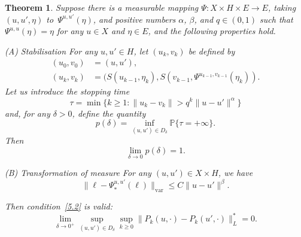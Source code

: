 \documentclass[11pt]{article}
\theoremstyle{plain}
\newtheorem{theorem}{Theorem}[section]
\theoremstyle{definition}
\newtheorem*{namedassumption}{\jepassumptionname}
\newenvironment{enonce*}[1]{\def\jepassumptionname{#1}\begin{namedassumption}}{\end{namedassumption}}
\theoremstyle{plain}
\numberwithin{equation}{section}
\newcommand{\IP}{{\mathbb P}}
\begin{document}
\begin{theorem} \label{T:1.2}
Suppose there is a measurable mapping $\varPsi:X\times H\times E\to E$, taking $(u,u',\eta)$ to~$\varPsi^{u,u'}(\eta)$, and positive numbers $\alpha$, $\beta$, and $q\in(0,1)$ such that $\varPsi^{u,u}(\eta)=\eta$ for any $u\in X$ and $\eta\in E$, and the following properties hold.
\begin{enonce*}{\hypertarget{(A)}{(A)} Stabilisation}
For any $u,u'\in H$, let $(u_k,v_k)$ be defined by\vspace*{-3pt}
\begin{align}
(u_0,v_0)&=(u,u'), \label{1.8}\\
(u_k,v_k)&=(S(u_{k-1},\eta_k),S(v_{k-1},\varPsi^{u_{k-1},v_{k-1}}(\eta_k)).
\label{1.9}
\end{align}
Let us introduce the stopping time\vspace*{-3pt}
\begin{equation} \label{tau}
\tau=\min\bigl\{k\ge1:\|u_k-v_k\|> q^{k}\|u-u'\|^\alpha\bigr\}
\end{equation}
and, for any $\delta>0$, define the quantity\vspace*{-3pt}
\[
p(\delta)=\inf_{(u,u')\in D_\delta}\IP\{\tau=+\infty\}.
\]
Then\vspace*{-3pt}
\begin{equation} \label{1.10}
\lim_{\delta\to0} p(\delta)=1.
\end{equation}
\end{enonce*}
\begin{enonce*}{\hypertarget{(B)}{(B)} Transformation of measure}
For any $(u,u')\in X\times H$, we have\vspace*{-3pt}
\begin{equation} \label{1.12}
\|\ell-\varPsi_*^{u,u'}(\ell)\|_{\mathrm{var}}\le C \|u-u'\|^\beta.
\end{equation}
\end{enonce*}
Then condition~\eqref{5.2} is valid:\vspace*{-3pt}
\begin{equation} \label{107}
\lim_{\delta\to0^+}\sup_{(u,u')\in D_\delta}\sup_{k\ge0}
\|P_k(u,\cdot)-P_k(u',\cdot)\|_L^*=0.
\end{equation}
\end{theorem}
\end{document}

